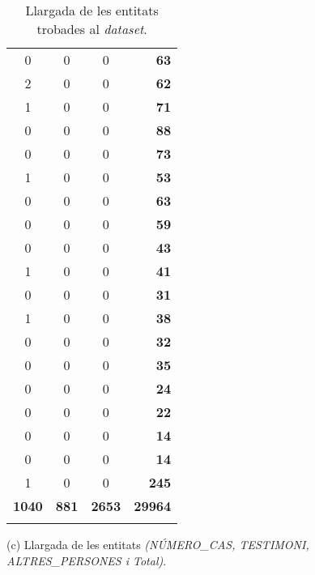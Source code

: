 \begin{table}[H]
\begin{tabular}{ccc|r|}
  0 & 0 & 0 & \textbf{63} \\
  2 & 0 & 0 & \textbf{62} \\
  1 & 0 & 0 & \textbf{71} \\
  0 & 0 & 0 & \textbf{88} \\
  0 & 0 & 0 & \textbf{73} \\
  1 & 0 & 0 & \textbf{53} \\
  0 & 0 & 0 & \textbf{63} \\
  0 & 0 & 0 & \textbf{59} \\
  0 & 0 & 0 & \textbf{43} \\
  1 & 0 & 0 & \textbf{41} \\
  0 & 0 & 0 & \textbf{31} \\
  1 & 0 & 0 & \textbf{38} \\
  0 & 0 & 0 & \textbf{32} \\
  0 & 0 & 0 & \textbf{35} \\
  0 & 0 & 0 & \textbf{24} \\
  0 & 0 & 0 & \textbf{22} \\
  0 & 0 & 0 & \textbf{14} \\
  0 & 0 & 0 & \textbf{14} \\
  1 & 0 & 0 & \textbf{245} \\
  \hline
  \textbf{1040} & \textbf{881} & \textbf{2653} & \textbf{29964}\\
  \Xhline{2\arrayrulewidth}
  \end{tabular}
  \captionsetup{font=small}
  \caption*{(c) Llargada de les entitats \textit{(NÚMERO\_CAS, TESTIMONI, ALTRES\_PERSONES i Total)}.}
  \captionsetup{font=normalsize}
  \caption{Llargada de les entitats trobades al \textit{dataset}.}
  \label{tab:llargada_entitats}
\end{table}


  